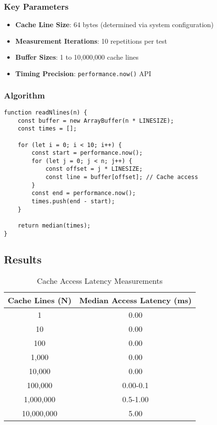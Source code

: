 \documentclass[11pt,a4paper]{article}
\begin{document}
\subsubsection{Key Parameters}
\begin{itemize}
    \item \textbf{Cache Line Size}: 64 bytes (determined via system configuration)
    \item \textbf{Measurement Iterations}: 10 repetitions per test
    \item \textbf{Buffer Sizes}: 1 to 10,000,000 cache lines
    \item \textbf{Timing Precision}: \texttt{performance.now()} API
\end{itemize}

\subsubsection{Algorithm}
\begin{lstlisting}[caption=Cache Latency Measurement Algorithm]
function readNlines(n) {
    const buffer = new ArrayBuffer(n * LINESIZE);
    const times = [];
    
    for (let i = 0; i < 10; i++) {
        const start = performance.now();
        for (let j = 0; j < n; j++) {
            const offset = j * LINESIZE;
            const line = buffer[offset]; // Cache access
        }
        const end = performance.now();
        times.push(end - start);
    }
    
    return median(times);
}
\end{lstlisting}

\subsection{Results}

\begin{table}[H]
\centering
\caption{Cache Access Latency Measurements}
\label{tab:latency}
\begin{tabular}{@{}cc@{}}
\toprule
Cache Lines (N) & Median Access Latency (ms) \\
\midrule
1 & 0.00 \\
10 & 0.00 \\
100 & 0.00 \\
1,000 & 0.00 \\
10,000 & 0.00 \\
100,000 & 0.00-0.1 \\
1,000,000 & 0.5-1.00 \\
10,000,000 & 5.00 \\
\bottomrule
\end{tabular}
\end{table}
\end{document}
